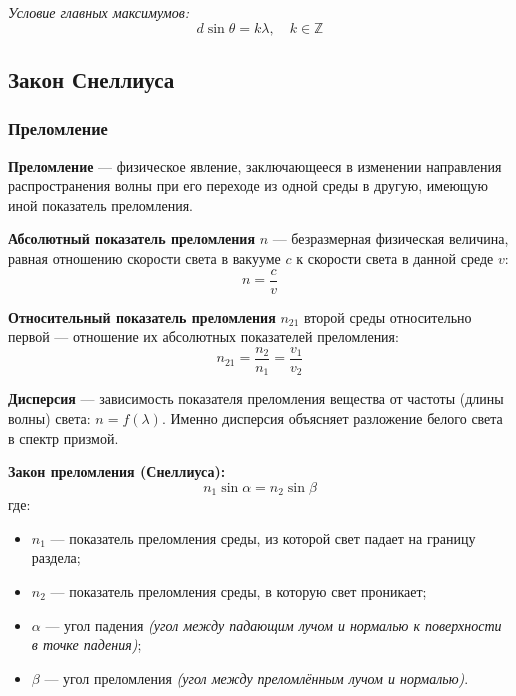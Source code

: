\begin{center}
\end{center}

\textit{Условие главных максимумов:}
\[\boxed{
d \sin \theta = k \lambda, \quad k \in\mathbb{Z}
}\]

\subsection{Закон Снеллиуса}

\subsubsection{Преломление}

\textbf{Преломление} --- физическое явление, заключающееся в изменении направления распространения волны при его переходе из одной среды в другую, имеющую иной показатель преломления.

\textbf{Абсолютный показатель преломления} $n$ --- безразмерная физическая величина, равная отношению скорости света в вакууме $c$ к скорости света в данной среде $v$:
\[
n = \frac{c}{v}
\]

\textbf{Относительный показатель преломления} $n_{21}$ второй среды относительно первой --- отношение их абсолютных показателей преломления:
\[
n_{21} = \frac{n_2}{n_1} = \frac{v_1}{v_2}
\]

\textbf{Дисперсия} --- зависимость показателя преломления вещества от частоты (длины волны) света: $n = f(\lambda)$. Именно дисперсия объясняет разложение белого света в спектр призмой.

\textbf{Закон преломления (Снеллиуса):}
\[
n_1 \sin \alpha = n_2 \sin \beta
\]
где:
\begin{itemize}
    \item $n_1$ --- показатель преломления среды, из которой свет падает на границу раздела;
    \item $n_2$ --- показатель преломления среды, в которую свет проникает;
    \item $\alpha$ --- угол падения \textit{(угол между падающим лучом и нормалью к поверхности в точке падения)};
    \item $\beta$ --- угол преломления \textit{(угол между преломлённым лучом и нормалью)}.
\end{itemize}

